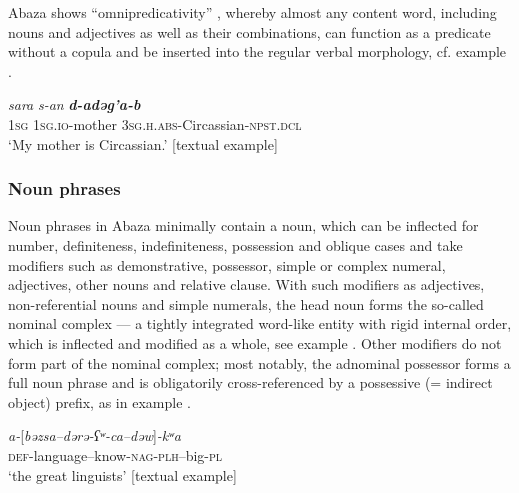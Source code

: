 \documentclass[output=paper]{langscibook}
\begin{document}

Abaza shows “omnipredicativity” \citep{Launey2004}, whereby almost any content word, including nouns and adjectives as well as their combinations, can function as a predicate without a copula and be inserted into the regular verbal morphology, cf. example .


\ea 
\label{ex:Arkadiev:4}
    \gll \textit{sara}  \textit{s-an}  \textbf{\textit{d-ad{ə}g’a-b} }\\
    \textsc{1sg}  \textsc{1sg.io}{}-mother  \textsc{3sg.h.abs}{}-Circassian-\textsc{npst.dcl}\\
    \glt ‘My mother is Circassian.’ [textual example]
\z
 

\subsubsection{Noun phrases}\label{sec:Arkadiev:1.2.2}
Noun phrases in Abaza minimally contain a noun, which can be inflected for number, definiteness, indefiniteness, possession and oblique cases and take modifiers such as demonstrative, possessor, simple or complex numeral, adjectives, other nouns and relative clause. With such modifiers as adjectives, non-referential nouns and simple numerals, the head noun forms the so-called nominal complex — a tightly integrated word-like entity with rigid internal order, which is inflected and modified as a whole, see example . Other modifiers do not form part of the nominal complex; most notably, the adnominal possessor forms a full noun phrase and is obligatorily cross-referenced by a possessive (= indirect object) prefix, as in example .


\ea 
\label{ex:Arkadiev:5}
    \gll \textit{a-}[\textit{b{ə}zsa–d{ə}r{ə}-{ʕ}{ʷ}{}-ca–d{ə}w}]\textit{{}-k{ʷ}a}\\
    \textsc{def}{}-language–know-\textsc{nag-plh}–big-\textsc{pl}\\
    \glt ‘the great linguists’ [textual example]
\z
 
\end{document}
